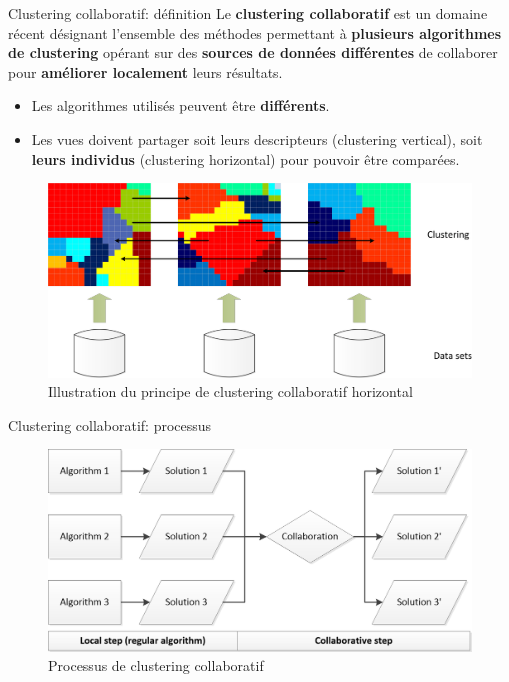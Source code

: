 \documentclass[hyperref={pdfpagelabels=false}]{beamer}
\begin{document}
    \begin{frame}{Clustering collaboratif: définition}
        Le \textbf{clustering collaboratif} est un domaine récent désignant 
        l'ensemble des méthodes permettant à \textbf{plusieurs algorithmes de 
        clustering} opérant sur des \textbf{sources de données différentes} de 
        collaborer pour \textbf{améliorer localement} leurs résultats.

        \begin{itemize}
            \item Les algorithmes utilisés peuvent être \textbf{différents}.
            \item Les vues doivent partager soit leurs descripteurs (clustering 
                vertical), soit \textbf{leurs individus} (clustering horizontal) 
                pour pouvoir être comparées.
        \end{itemize}
        \begin{figure}[b]
            \centering
            \includegraphics[scale=0.02]{hcc-min}
            \caption{Illustration du principe de clustering collaboratif 
            horizontal}
        \end{figure}
    \end{frame}

    \begin{frame}{Clustering collaboratif: processus}
        \begin{figure}[b]
            \centering
            \includegraphics[scale=.70]{clusteringcoll}
            \caption{Processus de clustering collaboratif}
        \end{figure}
    \end{frame}
\end{document}
